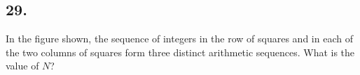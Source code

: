 \documentclass[12pt]{article}
\newcommand{\x}{\phantom{$-00$}}%
\begin{document}
\subsection*{29.}
In the figure shown, the sequence of integers in the row of squares and in each of the two columns of squares form three distinct arithmetic sequences. What is the value of $N$? 

\fbox{\phantom{ANSWER}}

\begin{center}
\end{center}
\end{document}
